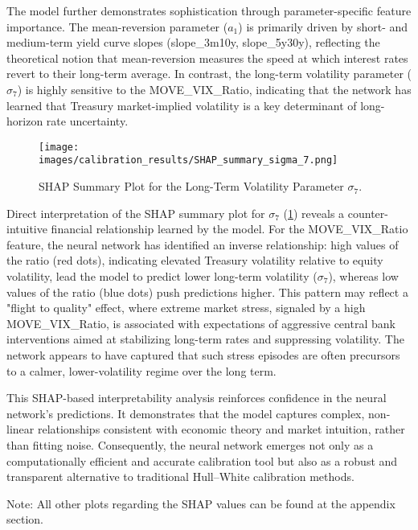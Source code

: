 The model further demonstrates sophistication through parameter-specific feature importance. The mean-reversion parameter (\(a_1\)) is primarily driven by short- and medium-term yield curve slopes (slope\_3m10y, slope\_5y30y), reflecting the theoretical notion that mean-reversion measures the speed at which interest rates revert to their long-term average. In contrast, the long-term volatility parameter (\(\sigma_7\)) is highly sensitive to the MOVE\_VIX\_Ratio, indicating that the network has learned that Treasury market-implied volatility is a key determinant of long-horizon rate uncertainty.

\begin{figure}[H]
	\centering
	\texttt{[image: images/calibration\_results/SHAP\_summary\_sigma\_7.png]}
	\caption{SHAP Summary Plot for the Long-Term Volatility Parameter \(\sigma_7\).}
	\label{fig:shap_summary_sigma_7}
\end{figure}

Direct interpretation of the SHAP summary plot for \(\sigma_7\) (\ref{fig:shap_summary_sigma_7}) reveals a counter-intuitive financial relationship learned by the model. For the MOVE\_VIX\_Ratio feature, the neural network has identified an inverse relationship: high values of the ratio (red dots), indicating elevated Treasury volatility relative to equity volatility, lead the model to predict lower long-term volatility (\(\sigma_7\)), whereas low values of the ratio (blue dots) push predictions higher. This pattern may reflect a "flight to quality" effect, where extreme market stress, signaled by a high MOVE\_VIX\_Ratio, is associated with expectations of aggressive central bank interventions aimed at stabilizing long-term rates and suppressing volatility. The network appears to have captured that such stress episodes are often precursors to a calmer, lower-volatility regime over the long term.


This SHAP-based interpretability analysis reinforces confidence in the neural network's predictions. It demonstrates that the model captures complex, non-linear relationships consistent with economic theory and market intuition, rather than fitting noise. Consequently, the neural network emerges not only as a computationally efficient and accurate calibration tool but also as a robust and transparent alternative to traditional Hull–White calibration methods.

Note: All other plots regarding the SHAP values can be found at the appendix section.


